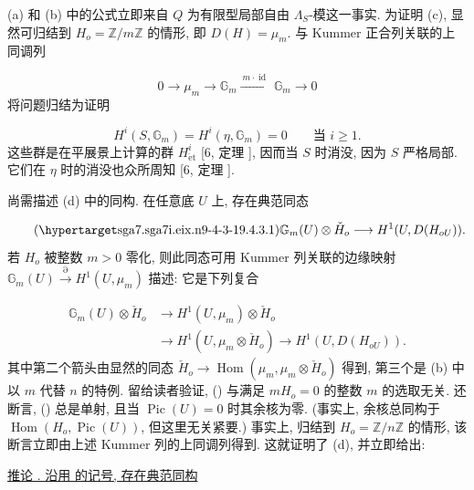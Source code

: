 (a) 和 (b) 中的公式立即来自 $Q$ 为有限型局部自由 $\Lambda_S$-模这一事实. 为证明 (c), 显然可归结到 $H_o=\mathbb Z/m\mathbb Z$ 的情形, 即 $D(H)=\mu_m$. 与 Kummer 正合列关联的上同调列

\begin{equation*}
0\longrightarrow\mu_m\longrightarrow\mathbb G_m
 \xrightarrow{\ m\cdot\operatorname{id}\ }\mathbb G_m
 \longrightarrow0
\end{equation*}
将问题归结为证明

\begin{equation*}
H^i(S,\mathbb G_m)=H^i(\eta,\mathbb G_m)=0
\qquad\text{当 }i\geq1.
\end{equation*}
这些群是在平展景上计算的群 $H^i_{\mathrm{\acute et}}$ [6, 定理 ], 因而当 $S$ 时消没, 因为 $S$ 严格局部. 它们在 $\eta$ 时的消没也众所周知 [6, 定理 ].

尚需描述 (d) 中的同构. 在任意底 $U$ 上, 存在典范同态

\begin{equation}\tag{\SGARefTarget{sga7.sga7i.eix.n9-4-3-1}{9.4.3.1}}
\mathbb G_m(U)\otimes\check H_o
\longrightarrow H^1(U,D(H_{oU})).
\end{equation}
若 $H_o$ 被整数 $m>0$ 零化, 则此同态可用 Kummer 列关联的边缘映射 $\mathbb G_m(U)\xrightarrow{\partial}H^1(U,\mu_m)$ 描述: 它是下列复合

\begin{equation*}
\begin{aligned}
\mathbb G_m(U)\otimes\check H_o
&\longrightarrow H^1(U,\mu_m)\otimes\check H_o\\
&\longrightarrow H^1(U,\mu_m\otimes\check H_o)
 \longrightarrow H^1(U,D(H_{oU})).
\end{aligned}
\end{equation*}
其中第二个箭头由显然的同态 $\check H_o\longrightarrow
\operatorname{Hom}(\mu_m,\mu_m\otimes\check H_o)$ 得到, 第三个是 (b) 中以 $m$ 代替 $n$ 的特例. 留给读者验证, () 与满足 $mH_o=0$ 的整数 $m$ 的选取无关. 还断言, () 总是单射, 且当 $\operatorname{Pic}(U)=0$ 时其余核为零. (事实上, 余核总同构于 $\operatorname{Hom}(H_o,\operatorname{Pic}(U))$, 但这里无关紧要.) 事实上, 归结到 $H_o=\mathbb Z/n\mathbb Z$ 的情形, 该断言立即由上述 Kummer 列的上同调列得到. 这就证明了 (d), 并立即给出:

\medskip
\noindent
\underline{推论 . 沿用  的记号, 存在典范同构}

